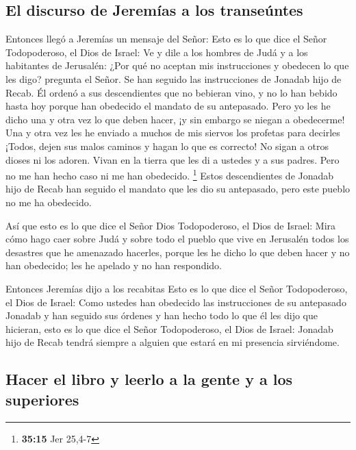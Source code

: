 \hypertarget{el-discurso-de-jeremuxedas-a-los-transeuxfantes}{%
\subsection{El discurso de Jeremías a los
transeúntes}\label{el-discurso-de-jeremuxedas-a-los-transeuxfantes}}

 Entonces llegó a Jeremías un mensaje del Señor:
 Esto es lo que dice el Señor Todopoderoso, el Dios de
Israel: Ve y dile a los hombres de Judá y a los habitantes de Jerusalén:
¿Por qué no aceptan mis instrucciones y obedecen lo que les digo?
pregunta el Señor.  Se han seguido las instrucciones de
Jonadab hijo de Recab. Él ordenó a sus descendientes que no bebieran
vino, y no lo han bebido hasta hoy porque han obedecido el mandato de su
antepasado. Pero yo les he dicho una y otra vez lo que deben hacer, ¡y
sin embargo se niegan a obedecerme!  Una y otra vez les
he enviado a muchos de mis siervos los profetas para decirles ¡Todos,
dejen sus malos caminos y hagan lo que es correcto! No sigan a otros
dioses ni los adoren. Vivan en la tierra que les di a ustedes y a sus
padres. Pero no me han hecho caso ni me han obedecido. \footnote{\textbf{35:15}
  Jer 25,4-7}  Estos descendientes de Jonadab hijo de
Recab han seguido el mandato que les dio su antepasado, pero este pueblo
no me ha obedecido.

 Así que esto es lo que dice el Señor Dios Todopoderoso,
el Dios de Israel: Mira cómo hago caer sobre Judá y sobre todo el pueblo
que vive en Jerusalén todos los desastres que he amenazado hacerles,
porque les he dicho lo que deben hacer y no han obedecido; les he
apelado y no han respondido.

 Entonces Jeremías dijo a los recabitas Esto es lo que
dice el Señor Todopoderoso, el Dios de Israel: Como ustedes han
obedecido las instrucciones de su antepasado Jonadab y han seguido sus
órdenes y han hecho todo lo que él les dijo que hicieran,
 esto es lo que dice el Señor Todopoderoso, el Dios de
Israel: Jonadab hijo de Recab tendrá siempre a alguien que estará en mi
presencia sirviéndome.

\hypertarget{hacer-el-libro-y-leerlo-a-la-gente-y-a-los-superiores}{%
\subsection{Hacer el libro y leerlo a la gente y a los
superiores}\label{hacer-el-libro-y-leerlo-a-la-gente-y-a-los-superiores}}

